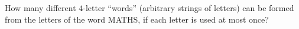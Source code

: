 How many different $4$-letter ``words'' (arbitrary strings of letters) can be formed from the letters of the word MATHS, if each letter is used at most once?
